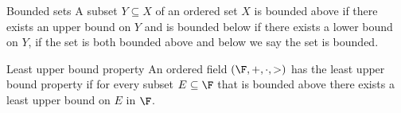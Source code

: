 \documentclass{report}
\begin{document}
\begin{definition}{Bounded sets}{}
  A subset $Y \subseteq X$ of an ordered set $X$
  is bounded above if there exists an upper bound on $Y$
  and is bounded below if there exists a lower bound on $Y$,
  if the set is both bounded above and below we say the set is bounded.
\end{definition}

\begin{definition}{Least upper bound property}{}
  An ordered field $\left(\F, +, \cdot, >\right)$ has the least upper bound property if
  for every subset $E \subseteq \F$ that is bounded above there exists a least upper bound on $E$ in $\F$.
\end{definition}
\end{document}
